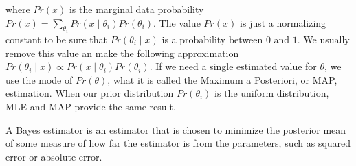 where $Pr\left(x\right)$ is the marginal data probability $Pr\left( x \right) = \sum_{\theta_i} Pr\left( x \mid \theta_i \right) Pr\left( \theta_i \right)$. The value $Pr\left(x\right)$ is just a normalizing constant to be sure that $Pr\left(\theta_i \mid x\right)$ is a probability between $0$ and $1$. We usually remove this value an make the following approximation $Pr\left(\theta_i \mid x\right) \propto Pr\left(x\mid\theta_i\right) Pr\left(\theta_i \right)$. If we need a single estimated value for $\theta$, we use the mode of $Pr(\theta)$, what it is called the Maximum a Posteriori, or MAP, estimation. When our prior distribution $Pr\left(\theta_i \right)$ is the uniform distribution, MLE and MAP provide the same result.

{\color{red} A Bayes estimator is an estimator that is chosen to minimize the posterior mean of some measure of how far the estimator is from the parameters, such as squared error or absolute error.}

